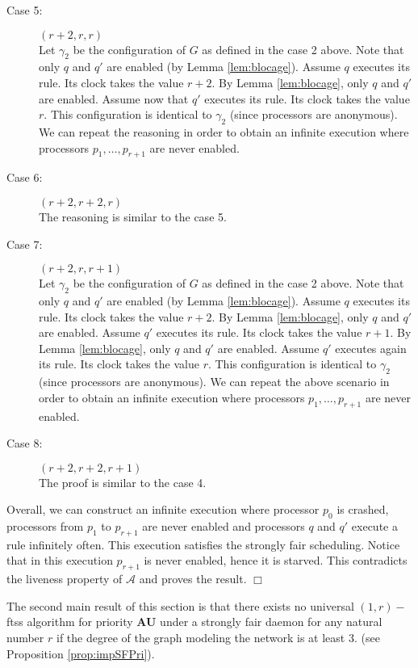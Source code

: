 \documentclass[11pt,english,letterpaper]{article}
\newenvironment{proof}{{\noindent\bf Proof. } }{{\hfill $\Box$}}
\begin{document}
\begin{proof}
\begin{description}
\item[Case 5:] $(r+2,r,r)$\\
Let $\gamma_{2}$ be the configuration of $G$ as defined in the case 2 above. Note that only $q$ and $q'$ are enabled (by Lemma \ref{lem:blocage}). Assume $q$ executes its rule. Its clock takes the value $r+2$. By Lemma \ref{lem:blocage}, only $q$ and $q'$ are enabled. Assume now that $q'$ executes its rule. Its clock takes the value $r$. This configuration is identical to $\gamma_{2}$ (since processors are anonymous). We can repeat the reasoning in order to obtain an infinite execution where processors $p_{1}, \ldots, p_{r+1}$ are never enabled.

\item[Case 6:] $(r+2,r+2,r)$\\
The reasoning is similar to the case 5.

\item[Case 7:] $(r+2,r,r+1)$\\
Let $\gamma_{2}$ be the configuration of $G$ as defined in the case 2 above. Note that only $q$ and $q'$ are enabled (by Lemma \ref{lem:blocage}). Assume $q$ executes its rule. Its clock takes the value  $r+2$. By Lemma \ref{lem:blocage}, only $q$ and $q'$ are enabled. Assume $q'$ executes its rule. Its clock takes the value $r+1$. By Lemma \ref{lem:blocage}, only $q$ and $q'$ are enabled. Assume $q'$ executes again its rule. Its clock takes the value $r$. This configuration is identical to $\gamma_{2}$ (since processors are anonymous). We can repeat the above scenario in order to obtain an infinite execution where processors $p_{1},\ldots,p_{r+1}$ are never enabled.

\item[Case 8:] $(r+2,r+2,r+1)$\\
The proof is similar to the case 4.

\end{description}

Overall, we can construct an infinite execution where processor $p_{0}$ is crashed, processors from $p_{1}$ to $p_{r+1}$ are never enabled and processors $q$ and $q'$ execute a rule infinitely often. This execution satisfies the strongly fair scheduling. Notice that in this execution  $p_{r+1}$ is never enabled, hence it is starved. This contradicts the liveness property of $\mathcal{A}$ and proves the result.
\end{proof}

The second main result of this section is that there exists no universal $(1,r)-$ftss algorithm for priority \textbf{AU} under a strongly fair daemon for any natural number $r$ if the degree of the graph modeling the network is at least 3. (see Proposition \ref{prop:impSFPri}).
\end{document}
